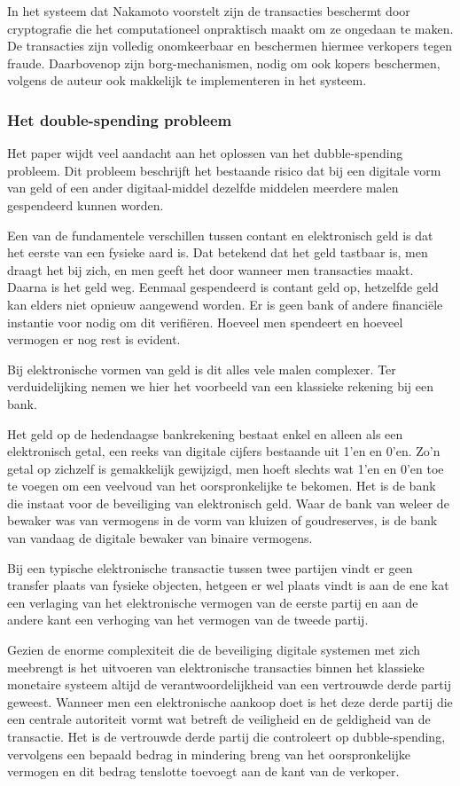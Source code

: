 			In het systeem dat Nakamoto voorstelt zijn de transacties beschermt door cryptografie die het computationeel onpraktisch maakt om ze ongedaan te maken. De transacties zijn volledig onomkeerbaar en beschermen hiermee verkopers tegen fraude. Daarbovenop zijn borg-mechanismen, nodig om ook kopers beschermen, volgens de auteur ook makkelijk te implementeren in het systeem.
			
			\subsubsection{Het double-spending probleem}
			Het paper wijdt veel aandacht aan het oplossen van het dubble-spending probleem. Dit probleem beschrijft het bestaande risico dat bij een digitale vorm van geld of een ander digitaal-middel dezelfde middelen meerdere malen gespendeerd kunnen worden.
			
			Een van de fundamentele verschillen tussen contant en elektronisch geld is dat het eerste van een fysieke aard is. Dat betekend dat het geld tastbaar is, men draagt het bij zich, en men geeft het door wanneer men transacties maakt. Daarna is het geld weg. Eenmaal gespendeerd is contant geld op, hetzelfde geld kan elders niet opnieuw aangewend worden. Er is geen bank of andere financiële instantie voor nodig om dit verifiëren. Hoeveel men spendeert en hoeveel vermogen er nog rest is evident. 
			
			Bij elektronische vormen van geld is dit alles vele malen complexer. Ter verduidelijking nemen we hier het voorbeeld van een klassieke rekening bij een bank.
			
			Het geld op de hedendaagse bankrekening bestaat enkel en alleen als een elektronisch getal, een reeks van digitale cijfers bestaande uit 1’en en 0’en. Zo’n getal op zichzelf is gemakkelijk gewijzigd, men hoeft slechts wat 1’en en 0’en toe te voegen om een veelvoud van het oorspronkelijke te bekomen. Het is de bank die instaat voor de beveiliging van elektronisch geld. Waar de bank van weleer de bewaker was van vermogens in de vorm van kluizen of goudreserves, is de bank van vandaag de digitale bewaker van binaire vermogens.
			
			Bij een typische elektronische transactie tussen twee partijen vindt er geen transfer plaats van fysieke objecten, hetgeen er wel plaats vindt is aan de ene kat een verlaging van het elektronische vermogen van de eerste partij en aan de andere kant een verhoging van het vermogen van de tweede partij. 
		
			Gezien de enorme complexiteit die de beveiliging digitale systemen met zich meebrengt is het uitvoeren van elektronische transacties binnen het klassieke monetaire systeem altijd de verantwoordelijkheid van een vertrouwde derde partij geweest. Wanneer men een elektronische aankoop doet is het deze derde partij die een centrale autoriteit vormt wat betreft de veiligheid en de geldigheid van de transactie. Het is de vertrouwde derde partij die controleert op dubble-spending, vervolgens een bepaald bedrag in mindering breng van het oorspronkelijke vermogen en dit bedrag tenslotte toevoegt aan de kant van de verkoper. 
			
